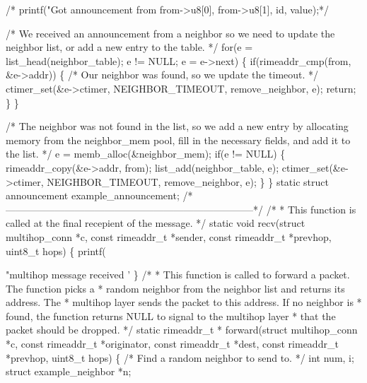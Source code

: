 \begin{DoxyCodeInclude}
  \textcolor{comment}{/*  printf("Got announcement from %
\textcolor{comment}{      from->u8[0], from->u8[1], id, value);*/}

  \textcolor{comment}{/* We received an announcement from a neighbor so we need to update}
\textcolor{comment}{     the neighbor list, or add a new entry to the table. */}
  \textcolor{keywordflow}{for}(e = list\_head(neighbor\_table); e != NULL; e = e->next) \{
    \textcolor{keywordflow}{if}(rimeaddr\_cmp(from, &e->addr)) \{
      \textcolor{comment}{/* Our neighbor was found, so we update the timeout. */}
      ctimer\_set(&e->ctimer, NEIGHBOR\_TIMEOUT, remove\_neighbor, e);
      \textcolor{keywordflow}{return};
    \}
  \}

  \textcolor{comment}{/* The neighbor was not found in the list, so we add a new entry by}
\textcolor{comment}{     allocating memory from the neighbor\_mem pool, fill in the}
\textcolor{comment}{     necessary fields, and add it to the list. */}
  e = memb\_alloc(&neighbor\_mem);
  \textcolor{keywordflow}{if}(e != NULL) \{
    rimeaddr\_copy(&e->addr, from);
    list\_add(neighbor\_table, e);
    ctimer\_set(&e->ctimer, NEIGHBOR\_TIMEOUT, remove\_neighbor, e);
  \}
\}
\textcolor{keyword}{static} \textcolor{keyword}{struct }announcement example\_announcement;
\textcolor{comment}{/*---------------------------------------------------------------------------*/}
\textcolor{comment}{/*}
\textcolor{comment}{ * This function is called at the final recepient of the message.}
\textcolor{comment}{ */}
\textcolor{keyword}{static} \textcolor{keywordtype}{void}
recv(\textcolor{keyword}{struct} multihop\_conn *c, \textcolor{keyword}{const} rimeaddr\_t *sender,
     \textcolor{keyword}{const} rimeaddr\_t *prevhop,
     uint8\_t hops)
\{
  printf(\textcolor{stringliteral}{"multihop message received '%
\}
\textcolor{comment}{/*}
\textcolor{comment}{ * This function is called to forward a packet. The function picks a}
\textcolor{comment}{ * random neighbor from the neighbor list and returns its address. The}
\textcolor{comment}{ * multihop layer sends the packet to this address. If no neighbor is}
\textcolor{comment}{ * found, the function returns NULL to signal to the multihop layer}
\textcolor{comment}{ * that the packet should be dropped.}
\textcolor{comment}{ */}
\textcolor{keyword}{static} rimeaddr\_t *
forward(\textcolor{keyword}{struct} multihop\_conn *c,
        \textcolor{keyword}{const} rimeaddr\_t *originator, \textcolor{keyword}{const} rimeaddr\_t *dest,
        \textcolor{keyword}{const} rimeaddr\_t *prevhop, uint8\_t hops)
\{
  \textcolor{comment}{/* Find a random neighbor to send to. */}
  \textcolor{keywordtype}{int} num, i;
  \textcolor{keyword}{struct }example\_neighbor *n;

}}
\end{DoxyCodeInclude}
